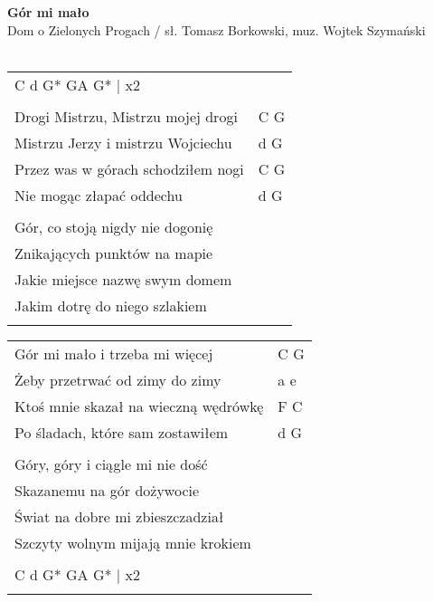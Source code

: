 \documentclass[a5paper]{article}
\begin{document}


\noindent
\fontsize{12pt}{15pt}\selectfont
\textbf{Gór mi mało} \\
\fontsize{8pt}{10pt}\selectfont
Dom o Zielonych Progach / sł. Tomasz Borkowski, muz. Wojtek Szymański \\ \\
\fontsize{10pt}{12pt}\selectfont
{}
\begin{tabular}{@{}p{8.50cm}p{3cm}@{}}
\noindent
C d G* GA G* | x2 & \\ \\

Drogi Mistrzu, Mistrzu mojej drogi & C G \\
Mistrzu Jerzy i mistrzu Wojciechu & d G \\
Przez was w górach schodziłem nogi & C G \\
Nie mogąc złapać oddechu & d G \\ \\

Gór, co stoją nigdy nie dogonię \\
Znikających punktów na mapie \\
Jakie miejsce nazwę swym domem \\
Jakim dotrę do niego szlakiem \\ \\
\end{tabular}

\noindent
\begin{tabular}{@{}p{7.50cm}p{3cm}@{}}
Gór mi mało i trzeba mi więcej & C G \\
Żeby przetrwać od zimy do zimy & a e \\
Ktoś mnie skazał na wieczną wędrówkę & F C \\
Po śladach, które sam zostawiłem & d G \\ \\

Góry, góry i ciągle mi nie dość & \\
Skazanemu na gór dożywocie & \\
Świat na dobre mi zbieszczadział & \\
Szczyty wolnym mijają mnie krokiem & \\ \\

C d G* GA G* | x2 \\ \\
\end{tabular}
\end{document}
